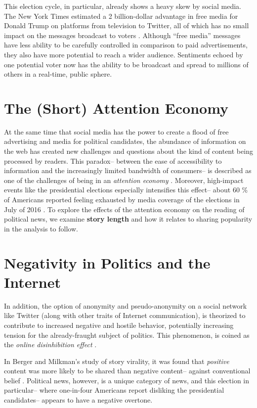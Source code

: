 This election cycle, in particular, already shows a heavy skew by social media. The New York Times estimated a 2 billion-dollar advantage in free media for Donald Trump on platforms from television to Twitter, all of which has no small impact on the messages broadcast to voters \cite{nyt-trump-free-media}. Although ``free media'' messages have less ability to be carefully controlled in comparison to paid advertisements, they also have more potential to reach a wider audience. Sentiments echoed by one potential voter now has the ability to be broadcast and spread to millions of others in a real-time, public sphere.
  
\section{The (Short) Attention Economy}
At the same time that social media has the power to create a flood of free advertising and media for political candidates, the abundance of information on the web has created new challenges and questions about the kind of content being processed by readers. This paradox-- between the ease of accessibility to information and the increasingly limited bandwidth of consumers-- is described as one of the challenges of being in an \emph{attention economy} \cite{goldhaber1997attention}. Moreover, high-impact events like the presidential elections especially intensifies this effect-- about 60 \% of Americans reported feeling exhausted by media coverage of the elections in July of 2016 \cite{election-fatigue}. To explore the effects of the attention economy on the reading of political news, we examine \textbf{story length} and how it relates to sharing popularity in the analysis to follow.


\section{Negativity in Politics and the Internet}
In addition, the option of anonymity and pseudo-anonymity on a social network like Twitter (along with other traits of Internet communication), is theorized to contribute to increased negative and hostile behavior, potentially increasing tension for the already-fraught subject of politics. This phenomenon, is coined as the \emph{online disinhibition effect} \cite{suler2004online}. 

In Berger and Milkman’s study of story virality, it was found that \emph{positive} content was more likely to be shared than negative content-- against conventional belief \cite{berger2012makes}. Political news, however, is a unique category of news, and this election in particular-- where one-in-four Americans report disliking the presidential candidates-- appears to have a negative overtone.

